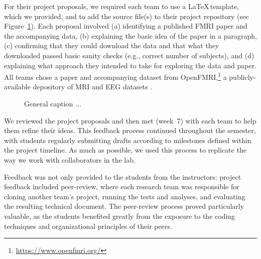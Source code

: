For their project proposals, we required each team to use a \LaTeX\,template,
which we provided, and to add the source file(s) to their project repository
(see Figure~\ref{fig:repo}).
Each proposal involved
(a) identifying a published FMRI paper and the accompanying data,
(b) explaining the basic idea of the paper in a paragraph,
(c) confirming that they could download the data and that what they
downloaded passed basic sanity checks (e.g., correct number of subjects), and
(d) explaining what approach they intended to take for exploring
the data and paper.
All teams chose a paper and accompanying dataset from
OpenFMRI,\footnote{\url{https://www.openfmri.org/}} a publicly-available
depository of MRI and EEG datasets
\citep{poldrack2013toward,poldrack2015openfmri}.


\begin{figure}
\centering

\caption{General caption ...}
\label{fig:repo}
\end{figure}

We reviewed the project proposals and then met
(week~7) with each team to help them refine their ideas.
This feedback process continued throughout the semester, with students
regularly submitting drafts according to milestones defined within the project
timeline.
As much as possible, we used this process to replicate the way we
work with collaborators in the lab.


Feedback was not only provided to the students from the instructors:
project feedback included peer-review, where each research team was
responsible for cloning another team's project, running the tests and analyses,
and evaluating the resulting technical document.
The peer-review process proved particularly valuable, as the students 
benefited greatly from the exposure to the coding techniques and 
organizational principles of their peers.

